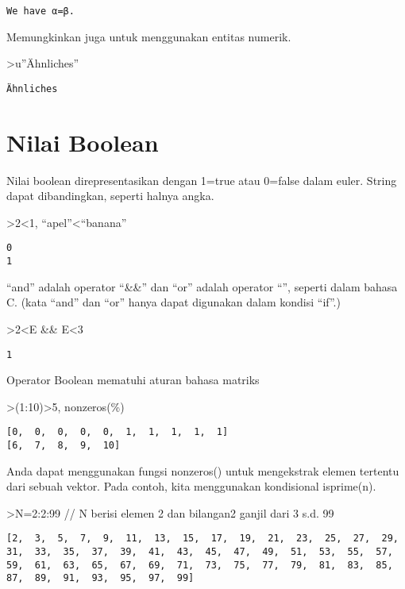 \documentclass[
]{book}
\begin{document}
\begin{verbatim}
We have α=β.
\end{verbatim}

Memungkinkan juga untuk menggunakan entitas numerik.

\textgreater u''Ähnliches''

\begin{verbatim}
Ähnliches
\end{verbatim}

\chapter{Nilai Boolean}\label{nilai-boolean}

Nilai boolean direpresentasikan dengan 1=true atau 0=false dalam euler. String dapat dibandingkan, seperti halnya angka.

\textgreater2\textless1, ``apel''\textless{}``banana''

\begin{verbatim}
0
1
\end{verbatim}

``and'' adalah operator ``\&\&'' dan ``or'' adalah operator ``\textbar\textbar{}'', seperti dalam bahasa C. (kata ``and'' dan ``or'' hanya dapat digunakan dalam kondisi ``if''.)

\textgreater2\textless E \&\& E\textless3

\begin{verbatim}
1
\end{verbatim}

Operator Boolean mematuhi aturan bahasa matriks

\textgreater(1:10)\textgreater5, nonzeros(\%)

\begin{verbatim}
[0,  0,  0,  0,  0,  1,  1,  1,  1,  1]
[6,  7,  8,  9,  10]
\end{verbatim}

Anda dapat menggunakan fungsi nonzeros() untuk mengekstrak elemen tertentu dari sebuah vektor. Pada contoh, kita menggunakan kondisional isprime(n).

\textgreater N=2:2:99 // N berisi elemen 2 dan bilangan2 ganjil dari 3 s.d. 99

\begin{verbatim}
[2,  3,  5,  7,  9,  11,  13,  15,  17,  19,  21,  23,  25,  27,  29,
31,  33,  35,  37,  39,  41,  43,  45,  47,  49,  51,  53,  55,  57,
59,  61,  63,  65,  67,  69,  71,  73,  75,  77,  79,  81,  83,  85,
87,  89,  91,  93,  95,  97,  99]
\end{verbatim}
\end{document}
